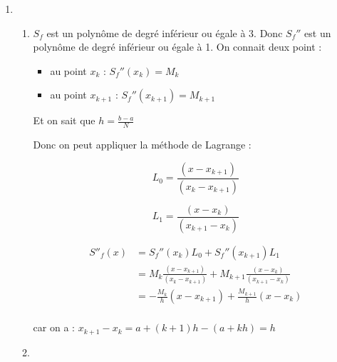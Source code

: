 \documentclass{article}
\begin{document}
\begin{enumerate}

\item

  \begin{enumerate}

  \item

    $S_f$ est un polynôme de degré inférieur ou égale à 3.\newline
    Donc $S_f''$ est un polynôme de degré inférieur ou égale à
    1.\newline
    On connait deux point :

    \begin{itemize}
    \item au point $x_k$ : $S_f''(x_k) = M_k$
    \item au point $x_{k + 1}$ : $S_f''(x_{k + 1}) = M_{k + 1}$
    \end{itemize}

    Et on sait que $h = \frac{b - a}{N}$ \newline

    Donc on peut appliquer la méthode de Lagrange : \newline

    \begin{equation*}
      L_0 = \frac{(x - x_{k + 1})}{(x_k - x_{k + 1})}
    \end{equation*}

    \begin{equation*}
      L_1 = \frac{(x - x_k)}{(x_{k + 1} - x_k)}
    \end{equation*}

    \begin{equation*}
      \begin{split}
        S''_f(x) & = S_f''(x_k) L_0 + S_f''(x_{k + 1}) L_1 \\
        & = M_k \frac{(x - x_{k + 1})}{(x_k - x_{k + 1})} + M_{k + 1}
        \frac{(x - x_k)}{(x_{k + 1} - x_k)} \\
        & = - \frac{M_k}{h} (x - x_{k + 1}) + 
        \frac{M_{k + 1}}{h} (x - x_k)\\
      \end{split}
    \end{equation*}

    car on a : $x_{k + 1} - x_k = a + (k + 1) h - (a + kh) = h$

  \item


\end{enumerate}
\end{enumerate}
\end{document}
